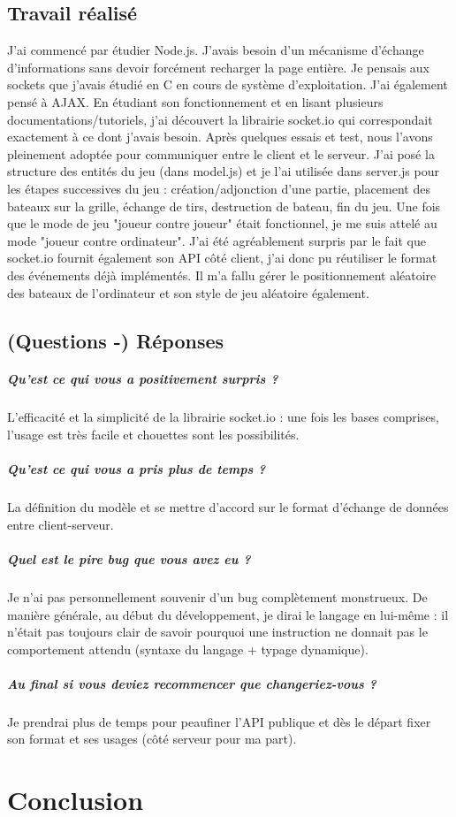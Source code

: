 \documentclass[a4paper, 11pt]{article}
\begin{document}
\subsection{Travail réalisé}
J'ai commencé par étudier Node.js. J'avais besoin d'un mécanisme d'échange d'informations sans devoir forcément recharger la page entière. Je pensais aux sockets que j'avais étudié en C en cours de système d'exploitation. J'ai également pensé à AJAX. En étudiant son fonctionnement et en lisant plusieurs documentations/tutoriels, j'ai découvert la librairie socket.io qui correspondait exactement à ce dont j'avais besoin. Après quelques essais et test, nous l'avons pleinement adoptée pour communiquer entre le client et le serveur. J'ai posé la structure des entités du jeu (dans model.js) et je l'ai utilisée dans server.js pour les étapes successives du jeu : création/adjonction d'une partie, placement des bateaux sur la grille, échange de tirs, destruction de bateau, fin du jeu. Une fois que le mode de jeu "joueur contre joueur" était fonctionnel, je me suis attelé au mode "joueur contre ordinateur". J'ai été agréablement surpris par le fait que socket.io fournit également son API côté client, j'ai donc pu réutiliser le format des événements déjà implémentés. Il m'a fallu gérer le positionnement aléatoire des bateaux de l'ordinateur et son style de jeu aléatoire également.

\subsection{(Questions -) Réponses}
\subparagraph{Qu’est ce qui vous a positivement surpris ?}
L'efficacité et la simplicité de la librairie socket.io : une fois les bases comprises, l'usage est très facile et chouettes sont les possibilités.
\subparagraph{Qu’est ce qui vous a pris plus de temps ?}
La définition du modèle et se mettre d'accord sur le format d'échange de données entre client-serveur.
\subparagraph{Quel est le pire bug que vous avez eu ?}
Je n'ai pas personnellement souvenir d'un bug complètement monstrueux. De manière générale, au début du développement, je dirai le langage en lui-même : il n'était pas toujours clair de savoir pourquoi une instruction ne donnait pas le comportement attendu (syntaxe du langage + typage dynamique).
\subparagraph{Au final si vous deviez recommencer que changeriez-vous ?}
Je prendrai plus de temps pour peaufiner l'API publique et dès le départ fixer son format et ses usages (côté serveur pour ma part).

\section{Conclusion}
\end{document}
